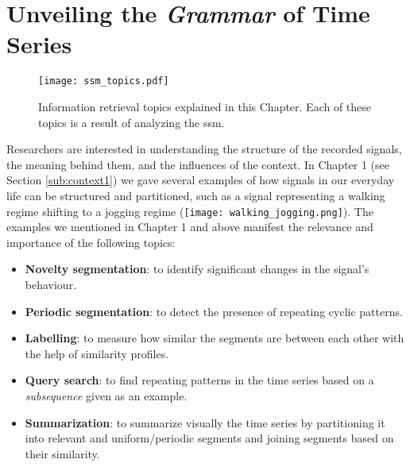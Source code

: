 
%

\chapter{Unveiling the \textit{Grammar} of Time Series}
\label{cha:segmentation}


\begin{figure}
\centering
\texttt{[image: ssm\_topics.pdf]}
\caption{Information retrieval topics explained in this Chapter. Each of these topics is a result of analyzing the \gls{ssm}.}
\label{fig:info_retrieval_topics}
\end{figure}

Researchers are interested in understanding the structure of the recorded signals, the meaning behind them, and the influences of the context. In Chapter 1 (see Section \ref{sub:context1}) we gave several examples of how signals in our everyday life can be structured and partitioned, such as a signal representing a \textcolor{myblue}{walking} regime shifting to a \textcolor{mygreen}{jogging} regime (\texttt{[image: walking\_jogging.png]}). The examples we mentioned in Chapter 1 and above manifest the relevance and importance of the following topics:

\begin{itemize}
     \item \textbf{Novelty segmentation}: to identify significant changes in the signal's behaviour.
    \item \textbf{Periodic segmentation}: to detect the presence of repeating cyclic patterns.
    \item \textbf{Labelling}: to measure how similar the segments are between each other with the help of similarity profiles.
    \item \textbf{Query search}: to find repeating patterns in the time series based on a \textit{subsequence} given as an example.
    \item \textbf{Summarization}: to summarize visually the time series by partitioning it into relevant and uniform/periodic segments and joining segments based on their similarity.
\end{itemize}

